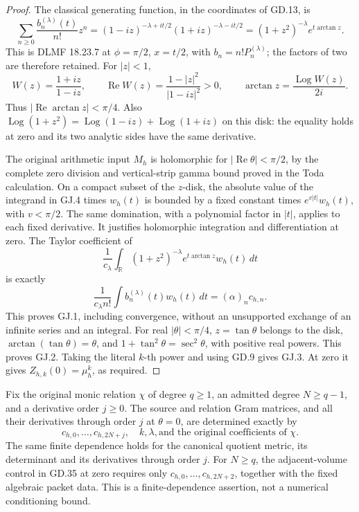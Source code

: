 \begin{proof}
The classical generating function, in the coordinates of GD.13, is
\[
\sum_{n\geq0}\frac{b_n^{(\lambda)}(t)}{n!}z^n
 =(1-iz)^{-\lambda+it/2}(1+iz)^{-\lambda-it/2}
 =(1+z^2)^{-\lambda}e^{t\arctan z}. \tag{GJ.4}
\]
This is DLMF 18.23.7 at \(\phi=\pi/2\), \(x=t/2\), with
\(b_n=n!P_n^{(\lambda)}\); the factors of two are therefore retained.
For \(|z|<1\),
\[
W(z)=\frac{1+iz}{1-iz},\qquad
\operatorname{Re}W(z)=\frac{1-|z|^2}{|1-iz|^2}>0,
\qquad \arctan z=\frac{\operatorname{Log}W(z)}{2i}.
\]
Thus \(|\operatorname{Re}\arctan z|<\pi/4\).
Also \(\operatorname{Log}(1+z^2)=
\operatorname{Log}(1-iz)+\operatorname{Log}(1+iz)\) on this disk:
the equality holds at zero and its two analytic sides have the same
derivative.

The original arithmetic input \(M_h\) is holomorphic for
\(|\operatorname{Re}\theta|<\pi/2\), by the complete zero division and
vertical-strip gamma bound proved in the Toda calculation.
On a compact subset of the \(z\)-disk, the absolute value of the integrand
in GJ.4 times \(w_h(t)\) is bounded by a fixed constant times
\(e^{v|t|}w_h(t)\), with \(v<\pi/2\).
The same domination, with a polynomial factor in \(|t|\), applies to
each fixed derivative. It justifies holomorphic integration and
differentiation at zero. The Taylor coefficient of
\[
\frac1{c_\lambda}\int_{\mathbb R}
 (1+z^2)^{-\lambda}e^{t\arctan z}w_h(t)\,dt
\]
is exactly
\[
\frac1{c_\lambda n!}\int b_n^{(\lambda)}(t)w_h(t)\,dt
       =(\alpha)_n c_{h,n}.
\]
This proves GJ.1, including convergence, without an unsupported exchange
of an infinite series and an integral. For real \(|\theta|<\pi/4\),
\(z=\tan\theta\) belongs to the disk,
\(\arctan(\tan\theta)=\theta\), and
\(1+\tan^2\theta=\sec^2\theta\), with positive real powers.
This proves GJ.2. Taking the literal \(k\)-th power and using GD.9 gives
GJ.3. At zero it gives \(Z_{h,k}(0)=\mu_h^k\), as required.
\end{proof}

\begin{proposition}
Fix the original monic relation \(\chi\) of degree \(q\geq1\), an
admitted degree \(N\geq q-1\), and a derivative order \(j\geq0\).
The source and relation Gram matrices, and all their derivatives through
order \(j\) at \(\theta=0\), are determined exactly by
\[
\boxed{c_{h,0},\ldots,c_{h,2N+j},\quad k,\lambda,
        \text{and the original coefficients of }\chi.} \tag{GJ.5}
\]
The same finite dependence holds for the canonical quotient metric,
its determinant and its derivatives through order \(j\).
For \(N\geq q\), the adjacent-volume control in GD.35 at zero requires
only \(c_{h,0},\ldots,c_{h,2N+2}\), together with the fixed algebraic
packet data. This is a finite-dependence assertion, not a numerical
conditioning bound.
\end{proposition}

